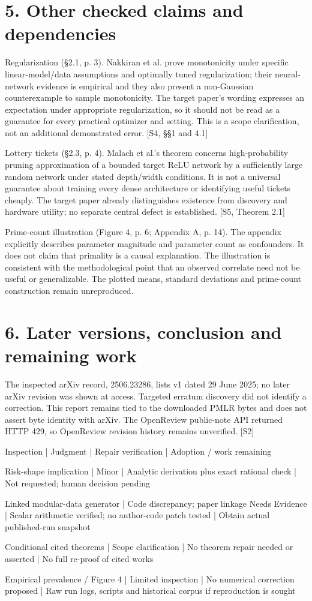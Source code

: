 \documentclass[10pt]{article}
\begin{document}
\section*{5. Other checked claims and dependencies}
Regularization (§2.1, p. 3). Nakkiran et al. prove monotonicity under specific linear-model/data assumptions and optimally tuned regularization; their neural-network evidence is empirical and they also present a non-Gaussian counterexample to sample monotonicity. The target paper’s wording expresses an expectation under appropriate regularization, so it should not be read as a guarantee for every practical optimizer and setting. This is a scope clarification, not an additional demonstrated error. [S4, §§1 and 4.1]\par
Lottery tickets (§2.3, p. 4). Malach et al.’s theorem concerns high-probability pruning approximation of a bounded target ReLU network by a sufficiently large random network under stated depth/width conditions. It is not a universal guarantee about training every dense architecture or identifying useful tickets cheaply. The target paper already distinguishes existence from discovery and hardware utility; no separate central defect is established. [S5, Theorem 2.1]\par
Prime-count illustration (Figure 4, p. 6; Appendix A, p. 14). The appendix explicitly describes parameter magnitude and parameter count as confounders. It does not claim that primality is a causal explanation. The illustration is consistent with the methodological point that an observed correlate need not be useful or generalizable. The plotted means, standard deviations and prime-count construction remain unreproduced.\par
\section*{6. Later versions, conclusion and remaining work}
The inspected arXiv record, 2506.23286, lists v1 dated 29 June 2025; no later arXiv revision was shown at access. Targeted erratum discovery did not identify a correction. This report remains tied to the downloaded PMLR bytes and does not assert byte identity with arXiv. The OpenReview public-note API returned HTTP 429, so OpenReview revision history remains unverified. [S2]\par
Inspection | Judgment | Repair verification | Adoption / work remaining\par
Risk-shape implication | Minor | Analytic derivation plus exact rational check | Not requested; human decision pending\par
Linked modular-data generator | Code discrepancy; paper linkage Needs Evidence | Scalar arithmetic verified; no author-code patch tested | Obtain actual published-run snapshot\par
Conditional cited theorems | Scope clarification | No theorem repair needed or asserted | No full re-proof of cited works\par
Empirical prevalence / Figure 4 | Limited inspection | No numerical correction proposed | Raw run logs, scripts and historical corpus if reproduction is sought\par
\end{document}
